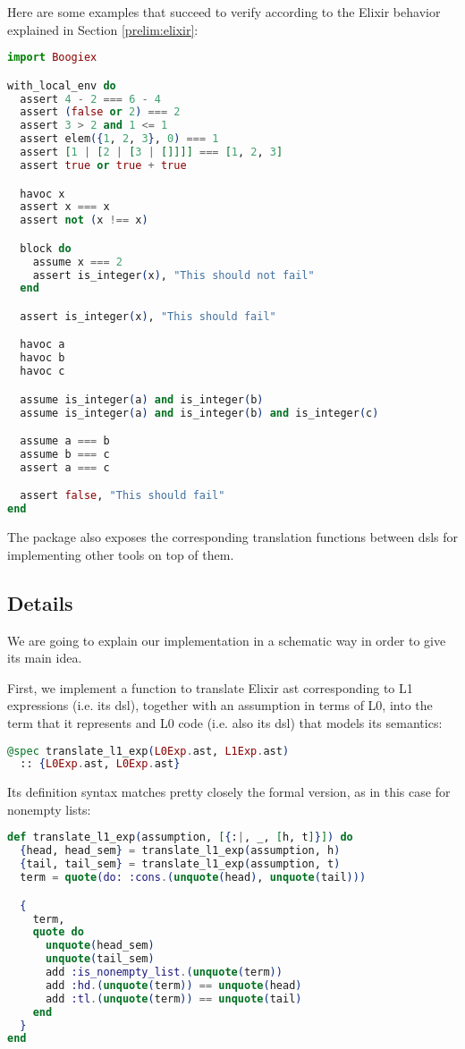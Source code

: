 Here are some examples that succeed to verify according to the Elixir behavior 
explained in Section \ref{prelim:elixir}:

\begin{lstlisting}[language=elixir,numbers=none,frame=none]
import Boogiex

with_local_env do
  assert 4 - 2 === 6 - 4
  assert (false or 2) === 2
  assert 3 > 2 and 1 <= 1
  assert elem({1, 2, 3}, 0) === 1
  assert [1 | [2 | [3 | []]]] === [1, 2, 3]
  assert true or true + true

  havoc x
  assert x === x
  assert not (x !== x)

  block do
    assume x === 2
    assert is_integer(x), "This should not fail"
  end

  assert is_integer(x), "This should fail"

  havoc a
  havoc b
  havoc c

  assume is_integer(a) and is_integer(b)
  assume is_integer(a) and is_integer(b) and is_integer(c)

  assume a === b
  assume b === c
  assert a === c

  assert false, "This should fail"
end
\end{lstlisting}

The package also exposes the corresponding translation functions between
\gls{dsl}s for implementing other tools on top of them.

\subsection{Details}
\label{ir:details}

We are going to explain our implementation in a schematic way in order to give
its main idea. 

First, we implement a function to translate Elixir \gls{ast} corresponding to L1
expressions (i.e. its \gls{dsl}), together with an assumption in terms of L0, 
into the term that it represents and L0 code (i.e. also its \gls{dsl}) that
models its semantics:

\begin{lstlisting}[language=elixir,numbers=none,frame=none]
@spec translate_l1_exp(L0Exp.ast, L1Exp.ast) 
  :: {L0Exp.ast, L0Exp.ast}
\end{lstlisting}

Its definition syntax matches pretty closely the formal version, as in this case
for nonempty lists:

\begin{lstlisting}[language=elixir,numbers=none,frame=none]
def translate_l1_exp(assumption, [{:|, _, [h, t]}]) do
  {head, head_sem} = translate_l1_exp(assumption, h)
  {tail, tail_sem} = translate_l1_exp(assumption, t)
  term = quote(do: :cons.(unquote(head), unquote(tail)))

  {
    term,
    quote do
      unquote(head_sem)
      unquote(tail_sem)
      add :is_nonempty_list.(unquote(term))
      add :hd.(unquote(term)) == unquote(head)
      add :tl.(unquote(term)) == unquote(tail)
    end
  }
end
\end{lstlisting}

